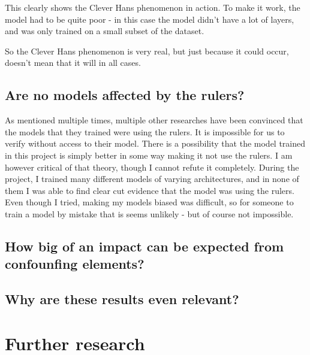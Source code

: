 This clearly shows the Clever Hans phenomenon in action.
To make it work, the model had to be quite poor - in this case the model didn't have a lot of layers,
and was only trained on a small subset of the dataset.

So the Clever Hans phenomenon is very real, but just because it could occur, doesn't mean that it will in all cases.

\subsection{Are no models affected by the rulers?}
As mentioned multiple times, multiple other researches have been convinced that the models that 
they trained were using the rulers.
It is impossible for us to verify without access to their model.
There is a possibility that the model trained in this project is simply better in some way making it not use the rulers.
I am however critical of that theory, though I cannot refute it completely.
During the project, I trained many different models of varying architectures,
and in none of them I was able to find clear cut evidence that the model was using the rulers.
Even though I tried, making my models biased was difficult, 
so for someone to train a model by mistake that is seems unlikely - but of course not impossible.

\subsection{How big of an impact can be expected from confounfing elements?}


\subsection{Why are these results even relevant?}



\section{Further research}

